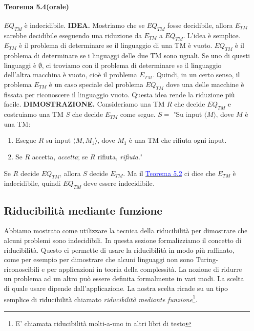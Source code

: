 \documentclass{article}
\begin{document}
\paragraph{Teorema 5.4(orale)}
\label{teorema-5.4}
\text{}
\newline
$EQ_{TM}$ è indecidibile.
\vspace{1em}
\text{}
\newline
\hbox{\textbf{IDEA.}}
Mostriamo che se $EQ_{TM}$ fosse decidibile, allora $E_{TM}$ sarebbe decidibile eseguendo una riduzione da $E_{TM}$ a $EQ_{TM}$.
L'idea è semplice.
$E_{TM}$ è il problema di determinare se il linguaggio di una TM è vuoto.
$EQ_{TM}$ è il problema di determinare se i linguaggi delle due TM sono uguali.
Se uno di questi linguaggi è $\emptyset$, ci troviamo con il problema di determinare se il linguaggio dell'altra macchina è vuoto, cioè il problema $E_{TM}$.
Quindi, in un certo senso, il problema $E_{TM}$ è un caso speciale del problema $EQ_{TM}$ dove una delle macchine è fissata per riconoscere il linguaggio vuoto.
Questa idea rende la riduzione più facile.
\vspace{1em}
\text{}
\newline
\hbox{\textbf{DIMOSTRAZIONE.}}
Consideriamo una TM $R$ che decide $EQ_{TM}$ e costruiamo una TM $S$ che decide $E_{TM}$ come segue.
\vspace{1em}
\text{}
\newline
$S = $ "Su input $\langle M \rangle$, dove $M$ è una TM:
\begin{enumerate}
    \item Esegue $R$ su input $\langle M,M_1 \rangle$, dove $M_1$ è una TM che rifiuta ogni input.
    \item Se $R$ accetta, \textit{accetta}; se $R$ rifiuta, \textit{rifiuta}."
\end{enumerate}
\vspace{1em}
\text{}
\newline
Se $R$ decide $EQ_{TM}$, allora $S$ decide $E_{TM}$. Ma il \hyperref[teorema-5.2]{\textcolor{blue}{Teorema 5.2}} ci dice che $E_{TM}$ è indecidibile, quindi $EQ_{TM}$ deve essere indecidibile.

\subsection{Riducibilità mediante funzione}
Abbiamo mostrato come utilizzare la tecnica della riducibilità per dimostrare che alcuni problemi sono indecidibili.
In questa sezione formalizziamo il concetto di riducibilità.
Questo ci permette di usare la riducibilità in modo più raffinato, come per esempio per dimostrare che alcuni linguaggi non sono Turing-riconoscibili e per applicazioni in teoria della complessità.
La nozione di ridurre un problema ad un altro può essere definita formalmente in vari modi.
La scelta di quale usare dipende dall'applicazione. La nostra scelta ricade su un tipo semplice di riducibilità chiamato \textit{riducibilità mediante funzione}\footnote{E' chiamata riducibilità molti-a-uno in altri libri di testo}.
\end{document}
